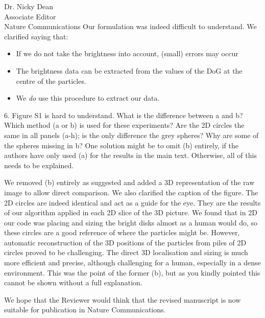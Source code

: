 \documentclass[a4paper, rebuttal, parskip=true, firsthead=false, fromemail=true, foldmarks=false]{scrlttr2}
\begin{document}
\begin{letter}{Dr. Nicky Dean\\
Associate Editor\\
Nature Communications}
Our formulation was indeed difficult to understand. We clarified saying that:
\begin{itemize}
\item If we do not take the brightness into account, (small) errors may occur
\item The brightness data can be extracted from the values of the DoG at the centre of the particles.
\item We \emph{do} use this procedure to extract our data.
\end{itemize}

\begin{quotationi}
6. Figure S1 is hard to understand. What is the difference between a and b? Which method (a or b) is used for these experiments? Are the 2D circles the same in all panels (a-h); is the only difference the grey spheres? Why are some of the spheres missing in b? One solution might be to omit (b) entirely, if the authors have only used (a) for the results in the main text. Otherwise, all of this needs to be explained.
\end{quotationi}

We removed (b) entirely as suggested and added a 3D representation of the raw image to allow direct comparison. We also clarified the caption of the figure. The 2D circles are indeed identical and act as a guide for the eye. They are the results of our algorithm applied in each 2D slice of the 3D picture. We found that in 2D our code was placing and sizing the bright disks almost as a human would do, so these circles are a good reference of where the particles might be. However, automatic reconstruction of the 3D positions of the particles from piles of 2D circles proved to be challenging. The direct 3D localisation and sizing is much more efficient and precise, although challenging for a human, especially in a dense environment. This was the point of the former (b), but as you kindly pointed this cannot be shown without a full explanation.


We hope that the Reviewer would think that the revised manuscript is now suitable for publication in Nature Communications. 


\end{letter} 
\end{document}

